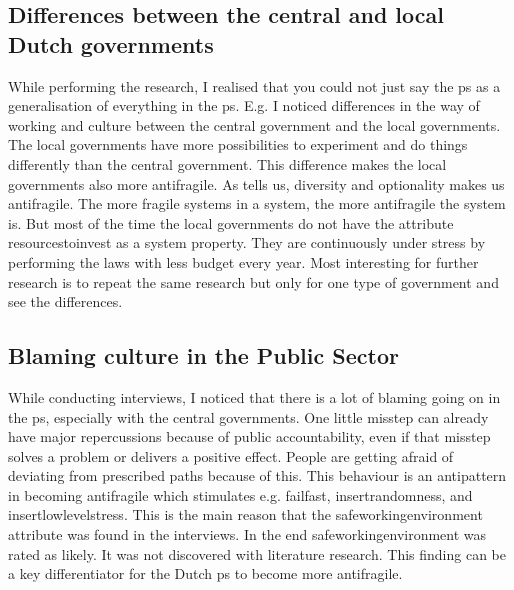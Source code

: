 \subsection{Differences between the central and local Dutch governments}
\label{sub:differenceslocalvscentral}
While performing the research, I realised that you could not just say the \gls{ps} as a generalisation of everything in the \gls{ps}. E.g. I noticed differences in the way of working and culture between the central government and the local governments. The local governments have more possibilities to experiment and do things differently than the central government. This difference makes the local governments also more \gls{antifragile}. As \textcite{Taleb2012} tells us, \gls{diversity} and \gls{optionality} makes us \gls{antifragile}. The more \gls{fragile} systems in a system, the more \gls{antifragile} the system is. But most of the time the local governments do not have the \gls{attribute} \gls{resourcestoinvest} as a system property. They are continuously under stress by performing the laws with less budget every year. Most interesting for further research is to repeat the same research but only for one type of government and see the differences.

\subsection{Blaming culture in the Public Sector}
\label{sub:blamingculture}
While conducting interviews, I noticed that there is a lot of blaming going on in the \gls{ps}, especially with the central governments. One little misstep can already have major repercussions because of public accountability, even if that misstep solves a problem or delivers a positive effect. People are getting afraid of deviating from prescribed paths because of this. This behaviour is an antipattern in becoming \gls{antifragile} which stimulates e.g. \gls{failfast}, \gls{insertrandomness}, and \gls{insertlowlevelstress}. This is the main reason that the \gls{safeworkingenvironment} \gls{attribute} was found in the interviews. In the end \gls{safeworkingenvironment} was rated as likely. It was not discovered with literature research. This finding can be a key differentiator for the Dutch \gls{ps} to become more \gls{antifragile}.

